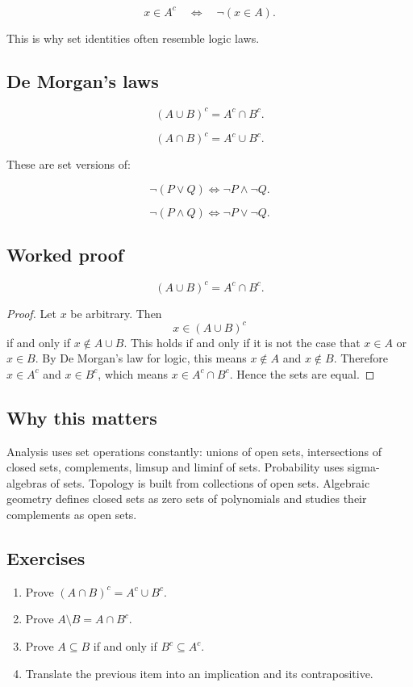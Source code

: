 \documentclass[12pt]{article}
\begin{document}
\[
x\in A^c\quad\Longleftrightarrow\quad \neg(x\in A).
\]

This is why set identities often resemble logic laws.

\subsection{De Morgan's laws}

\[
(A\cup B)^c=A^c\cap B^c.
\]

\[
(A\cap B)^c=A^c\cup B^c.
\]

These are set versions of:

\[
\neg(P\lor Q)\Longleftrightarrow \neg P\land\neg Q.
\]

\[
\neg(P\land Q)\Longleftrightarrow \neg P\lor\neg Q.
\]

\subsection{Worked proof}

\begin{theorem}
\[
(A\cup B)^c=A^c\cap B^c.
\]
\end{theorem}

\begin{proof}
Let $x$ be arbitrary. Then
\[
x\in(A\cup B)^c
\]
if and only if $x\notin A\cup B$. This holds if and only if it is not the case that $x\in A$ or $x\in B$. By De Morgan's law for logic, this means $x\notin A$ and $x\notin B$. Therefore $x\in A^c$ and $x\in B^c$, which means $x\in A^c\cap B^c$. Hence the sets are equal.
\end{proof}

\subsection{Why this matters}

Analysis uses set operations constantly: unions of open sets, intersections of closed sets, complements, limsup and liminf of sets. Probability uses sigma-algebras of sets. Topology is built from collections of open sets. Algebraic geometry defines closed sets as zero sets of polynomials and studies their complements as open sets.

\subsection{Exercises}

\begin{enumerate}
\item Prove $(A\cap B)^c=A^c\cup B^c$.
\item Prove $A\setminus B=A\cap B^c$.
\item Prove $A\subseteq B$ if and only if $B^c\subseteq A^c$.
\item Translate the previous item into an implication and its contrapositive.
\end{enumerate}
\end{document}
